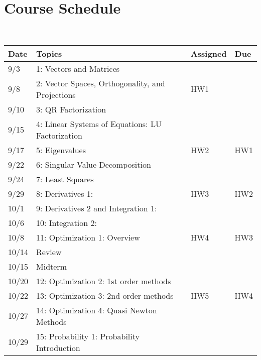 \documentclass[11pt]{article}
\begin{document}
\newpage
\section*{Course Schedule}

~\\
\small
\begin{centering}
\begin{tabular}{||l|p{3in}|l|l||}
\hline\hline
Date & Topics  & Assigned & Due  \\
\hline\hline
9/3 & 1: Vectors and Matrices &   & \\
\hline
9/8 & 2: Vector Spaces, Orthogonality, and Projections & HW1   & \\
9/10& 3: QR Factorization &   & \\
\hline
9/15 &  4: Linear Systems of Equations: LU Factorization &  &  \\
9/17& 5: Eigenvalues & HW2 & HW1  \\
\hline
9/22& 6: Singular Value Decomposition &   &   \\
9/24 & 7: Least Squares  &  & \\
\hline
9/29 & 8:  Derivatives 1: & HW3 & HW2  \\ 
10/1 & 9: Derivatives 2 and Integration 1: & & \\
\hline
10/6 & 10: Integration 2: &  &  \\
10/8& 11: Optimization 1: Overview & HW4  & HW3  \\  
\hline 
10/14& Review &  &   \\
10/15 & Midterm& &\\
\hline
10/20 & 12: Optimization 2: 1st order methods   &  &\\
10/22 & 13: Optimization 3: 2nd order methods  &HW5  & HW4 \\ 
\hline
  
10/27 & 14: Optimization 4: Quasi Newton Methods & &  \\  
10/29& 15:  Probability 1: Probability Introduction  & & \\
\hline


\end{tabular}
\end{centering}
\end{document}
